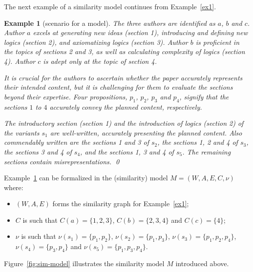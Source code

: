 \documentclass{article}
\newtheorem{example}[theorem]{Example}%
\newcommand{\ab}{\ensuremath{A}\xspace}
\begin{document}
The next example of a similarity model continues from Example~\ref{ex1}.

\begin{example}[scenario for a model]\label{ex2}
The three authors are identified as $a$, $b$ and $c$. Author $a$ excels at generating new ideas (section 1), introducing and defining new logics (section 2), and axiomatizing logics (section 3). Author $b$ is proficient in the topics of sections 2 and 3, as well as calculating complexity of logics (section 4). Author $c$ is adept only at the topic of section 4.

It is crucial for the authors to ascertain whether the paper accurately represents their intended content, but it is challenging for them to evaluate the sections beyond their expertise. Four propositions, $p_1$, $p_2$, $p_3$ and $p_4$, signify that the sections $1$ to $4$ accurately convey the planned content, respectively.

The introductory section (section 1) and the introduction of logics (section 2) of the variants $s_1$ are well-written, accurately presenting the planned content. Also commendably written are the sections 1 and 3 of $s_2$, the sections 1, 2 and 4 of $s_3$, the sections 3 and 4 of $s_4$, and the sections 1, 3 and 4 of $s_5$. The remaining sections contain misrepresentations.
\qed
\end{example}

Example~\ref{ex2} can be formalized in the (similarity) model $M = (W,\ab,E,C,\nu)$ where:
\begin{itemize}
\item $(W,\ab,E)$ forms the similarity graph for Example~\ref{ex1};
\item $C$ is such that $C(a) = \{1,2,3\}$, $C(b) = \{2,3,4\}$ and $C(c) = \{4\}$;
\item $\nu$ is such that $\nu(s_1) = \{p_1, p_2\}$, $\nu(s_2) = \{p_1,p_3\}$, $\nu(s_3) = \{p_1, p_2, p_4\}$, $\nu(s_4) = \{p_3,p_4\}$ and $\nu(s_5) = \{p_1,p_3,p_4\}$.
\end{itemize}
Figure~\ref{fig:sim-model} illustrates the similarity model $M$ introduced above.
\end{document}
